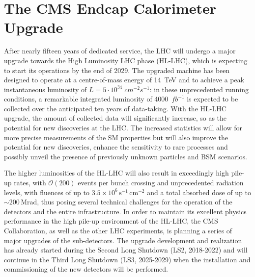 



\chapter{The CMS Endcap Calorimeter Upgrade}
\label{chapter:The CMS Endcap Calorimeter Upgrade}

After nearly fifteen years of dedicated service, the LHC will undergo a major upgrade towards the High Luminosity LHC phase (HL-LHC), which is expecting to start its operations by the end of 2029.
The upgraded machine has been designed to operate at a  centre-of-mass energy of 14~TeV and to achieve a peak instantaneous luminosity of $L=5\cdot10^{34}\;cm^{-2}s^{-1}$: in these unprecedented running conditions, a remarkable integrated luminosity of 4000~$fb^{-1}$ is expected to be collected over the anticipated ten years of data-taking. 
With the HL-LHC upgrade, the amount of collected data will significantly increase, so as the potential for new discoveries at the LHC. The increased statistics will allow for more precise measurements of the SM properties but will also improve the potential for new discoveries, enhance the sensitivity to rare processes and possibly unveil the presence of previously unknown particles and BSM scenarios.

The higher luminosities of the HL-LHC will also result in exceedingly high pile-up rates, with $\mathcal{O}(200)$ events per bunch crossing and unprecedented radiation levels, with fluences of up to $3.5\times10^6\,\textrm{s}^{-1}\,\textrm{cm}^{-2}$ and a total absorbed dose of up to $\sim$$200\,\textrm{Mrad}$, thus posing several technical challenges for the operation of the detectors and the entire infrastructure.
In order to maintain its excellent physics performance in the high pile-up environment of the HL-LHC, the CMS Collaboration, as well as the other LHC experiments, is planning a series of major upgrades of the sub-detectors. The upgrade development and realization has already started during the Second Long Shutdown (LS2, 2018-2022) and will continue in the Third Long Shutdown (LS3, 2025-2029) when the installation and commissioning of the new detectors will be performed. 

